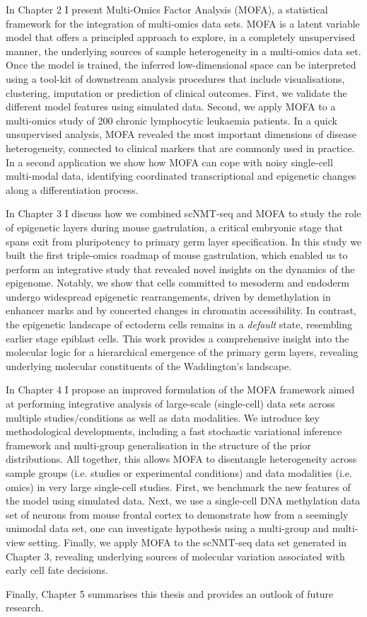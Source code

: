 In Chapter 2 I present Multi-Omics Factor Analysis (MOFA), a statistical framework for the integration of multi-omics data sets. MOFA is a latent variable model that offers a principled approach to explore, in a completely unsupervised manner, the underlying sources of sample heterogeneity in a multi-omics data set. Once the model is trained, the inferred low-dimensional space can be interpreted using a tool-kit of downstream analysis procedures that include visualisations, clustering, imputation or prediction of clinical outcomes. First, we validate the different model features using simulated data. Second, we apply MOFA to a multi-omics study of 200 chronic lymphocytic leukaemia patients. In a quick unsupervised analysis, MOFA revealed the most important dimensions of disease heterogeneity, connected to clinical markers that are commonly used in practice. In a second application we show how MOFA can cope with noisy single-cell multi-modal data, identifying coordinated transcriptional and epigenetic changes along a differentiation process.

In Chapter 3 I discuss how we combined scNMT-seq and MOFA to study the role of epigenetic layers during mouse gastrulation, a critical embryonic stage that spans exit from pluripotency to primary germ layer specification. In this study we built the first triple-omics roadmap of mouse gastrulation, which enabled us to perform an integrative study that revealed novel insights on the dynamics of the epigenome. Notably, we show that cells committed to mesoderm and endoderm undergo widespread epigenetic rearrangements, driven by demethylation in enhancer marks and by concerted changes in chromatin accessibility. In contrast, the epigenetic landscape of ectoderm cells remains in a \textit{default} state, resembling earlier stage epiblast cells. This work provides a comprehensive insight into the molecular logic for a hierarchical emergence of the primary germ layers, revealing underlying molecular constituents of the Waddington's landscape.

In Chapter 4 I propose an improved formulation of the MOFA framework aimed at performing integrative analysis of large-scale (single-cell) data sets across multiple studies/conditions as well as data modalities. We introduce key methodological developments, including a fast stochastic variational inference framework and multi-group generalisation in the structure of the prior distributions. All together, this allows MOFA to  disentangle heterogeneity across sample groups (i.e. studies or experimental conditions) and data modalities (i.e. omics) in very large single-cell studies. First, we benchmark the new features of the model using simulated data. Next, we use a single-cell DNA methylation data set of neurons from mouse frontal cortex to demonstrate how from a seemingly unimodal data set, one can investigate hypothesis using a multi-group and multi-view setting. Finally, we apply MOFA to the scNMT-seq data set generated in Chapter 3, revealing underlying sources of molecular variation associated with early cell fate decisions.

Finally, Chapter 5 summarises this thesis and provides an outlook of future research.
